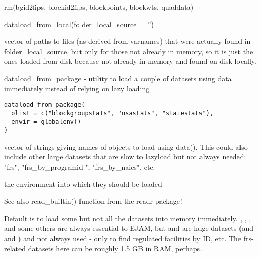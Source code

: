 \documentclass[a4paper]{book}
\begin{document}
%
\begin{Details}\relax
rm(bgid2fips, blockid2fips, blockpoints, blockwts, quaddata)

dataload\_from\_local(folder\_local\_source = '.')
\end{Details}
%
\begin{Value}
vector of paths to files (as derived from varnames) that were
actually found in folder\_local\_source,
but only for those not already in memory, so it is
just the ones loaded from disk because not already in memory and found on disk locally.
\end{Value}
%
\begin{Description}\relax
dataload\_from\_package - utility to load a couple of datasets using data immediately instead of relying on lazy loading
\end{Description}
%
\begin{Usage}
\begin{verbatim}
dataload_from_package(
  olist = c("blockgroupstats", "usastats", "statestats"),
  envir = globalenv()
)
\end{verbatim}
\end{Usage}
%
\begin{Arguments}
\begin{ldescription}
\item[\code{olist}] vector of strings giving names of objects to load using data().
This could also include other large datasets that are slow to lazyload but not always needed:
"frs", "frs\_by\_programid ", "frs\_by\_naics", etc.

\item[\code{envir}] the environment into which they should be loaded
\end{ldescription}
\end{Arguments}
%
\begin{Details}\relax
See also read\_builtin() function from the readr package!

Default is to load some but not all the datasets into memory immediately.
, , , and some others are always essential to EJAM, but
 and  are huge datasets (and  and )
and not always used - only to find regulated facilities by ID, etc.
The frs-related datasets here can be roughly 1.5 GB in RAM, perhaps.
\end{Details}
\end{document}
